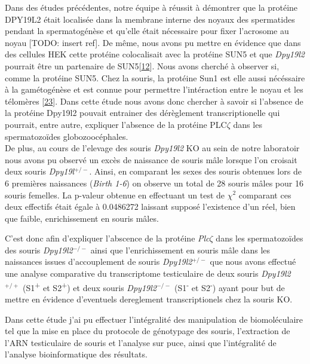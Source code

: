 \documentclass[12pt,twoside]{reedthesis}
\begin{document}
  Dans des études précédentes, notre équipe à réussit à démontrer que la
  protéine DPY19L2 était localisée dans la membrane interne des noyaux des
  spermatides pendant la spermatogénèse et qu'elle était nécessaire pour
  fixer l'acrosome au noyau {[}TODO: insert ref{]}. De même, nous avons pu
  mettre en évidence que dans des cellules HEK cette protéine colocalisait
  avec la protéine SUN5 et que \emph{Dpy19l2} pourrait être un partenaire
  de SUN5{[}\protect\hyperlink{ref-Pierre2012}{12}{]}. Nous avons cherché
  à observer si, comme la protéine SUN5. Chez la souris, la protéine Sun1
  est elle aussi nécéssaire à la gamétogénèse et est connue pour permettre
  l'intéraction entre le noyau et les télomères
  {[}\protect\hyperlink{ref-Ding2007}{23}{]}. Dans cette étude nous avons
  donc chercher à savoir si l'absence de la protéine Dpy19l2 pouvait
  entrainer des dérèglement transcriptionelle qui pourrait, entre autre,
  expliquer l'absence de la protéine PLC\(\zeta\) dans les spermatozoïdes
  globozoocéphales.\\
  De plus, au cours de l'elevage des souris \emph{Dpy19l2} KO au sein de
  notre laboratoir nous avons pu observé un excès de naissance de souris
  mâle lorsque l'on croisait deux souris \emph{Dpy19l}\(^{+/-}\). Ainsi,
  en comparant les sexes des souris obtenues lors de 6 premières
  naissances (\emph{Birth 1-6}) on observe un total de 28 souris mâles
  pour 16 souris femelles. La p-valeur obtenue en effectuant un test de
  \(\chi^2\) comparant ces deux effectifs était égale à 0.0486272 laissant
  supposé l'existence d'un réel, bien que faible, enrichissement en souris
  mâles.
  
  C'est donc afin d'expliquer l'abscence de la protéine
  \emph{Plc}\(\zeta\) dans les spermatozoïdes des souris
  \emph{Dpy19l2}\(^{-/-}\) ainsi que l'enrichissement en souris mâle dans
  les naissances issues d'accouplement de souris \emph{Dpy19l2}\(^{+/-}\)
  que nous avons effectué une analyse comparative du transcriptome
  testiculaire de deux souris \emph{Dpy19l2}\(^{+/+}\)
  (S1\textsuperscript{+} et S2\textsuperscript{+}) et deux souris
  \emph{Dpy19l2}\(^{-/-}\) (S1\textsuperscript{-} et
  S2\textsuperscript{-}) ayant pour but de mettre en évidence d'eventuels
  dereglement transcriptionels chez la souris KO.
  
  Dans cette étude j'ai pu effectuer l'intégralité des manipulation de
  biomoléculaire tel que la mise en place du protocole de génotypage des
  souris, l'extraction de l'ARN testiculaire de souris et l'analyse sur
  puce, ainsi que l'intégralité de l'analyse bioinformatique des
  résultats.
  
\end{document}
